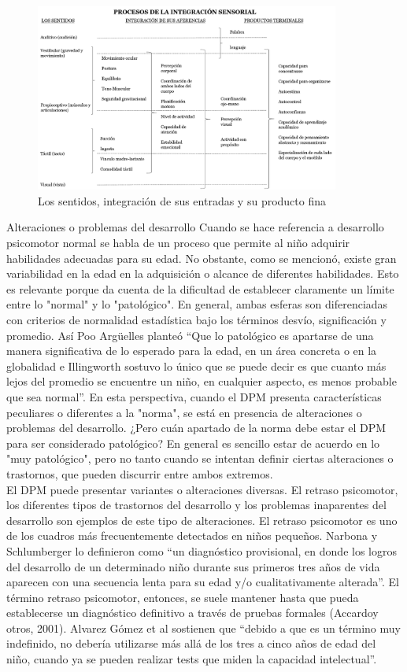 			\begin{figure}
				\centering
				\includegraphics[width=10cm]{Imagenes/Figuras/01.png}
				\caption{Los sentidos, integración de sus entradas y su producto fina}
			\end{figure}
			Alteraciones o problemas del desarrollo
			Cuando se hace referencia a desarrollo psicomotor normal se habla de un proceso que permite al niño adquirir habilidades adecuadas para su edad. No obstante, como se mencionó, existe gran variabilidad en la edad en la adquisición o alcance de diferentes habilidades. Esto es relevante porque da cuenta de la dificultad de establecer claramente un límite entre lo "normal" y lo "patológico". En general, ambas esferas son diferenciadas con criterios de normalidad estadística bajo los términos desvío, significación y promedio. Así Poo Argüelles planteó “Que lo patológico es apartarse de una manera significativa de lo esperado para la edad, en un área concreta o en la globalidad e Illingworth sostuvo lo único que se puede decir es que cuanto más lejos del promedio se encuentre un niño, en cualquier aspecto, es menos probable que sea normal”. En esta perspectiva, cuando el DPM presenta características peculiares o diferentes a la "norma", se está en presencia de alteraciones o problemas del desarrollo. ¿Pero cuán apartado de la norma debe estar el DPM para ser considerado patológico? En general es sencillo estar de acuerdo en lo "muy patológico", pero no tanto cuando se intentan definir ciertas alteraciones o trastornos, que pueden discurrir entre ambos extremos.\\
			El DPM puede presentar variantes o alteraciones diversas. El retraso psicomotor, los diferentes tipos de trastornos del desarrollo y los problemas inaparentes del desarrollo son ejemplos de este tipo de alteraciones. El retraso psicomotor es uno de los cuadros más frecuentemente detectados en niños pequeños. Narbona y Schlumberger lo definieron como “un diagnóstico provisional, en donde los logros del desarrollo de un determinado niño durante sus primeros tres años de vida aparecen con una secuencia lenta para su edad y/o cualitativamente alterada”. El término retraso psicomotor, entonces, se suele mantener hasta que pueda establecerse un diagnóstico definitivo a través de pruebas formales (Accardoy otros, 2001). Alvarez Gómez et al sostienen que “debido a que es un término muy indefinido, no debería utilizarse más allá de los tres a cinco años de edad del niño, cuando ya se pueden realizar tests que miden la capacidad intelectual”.\\

